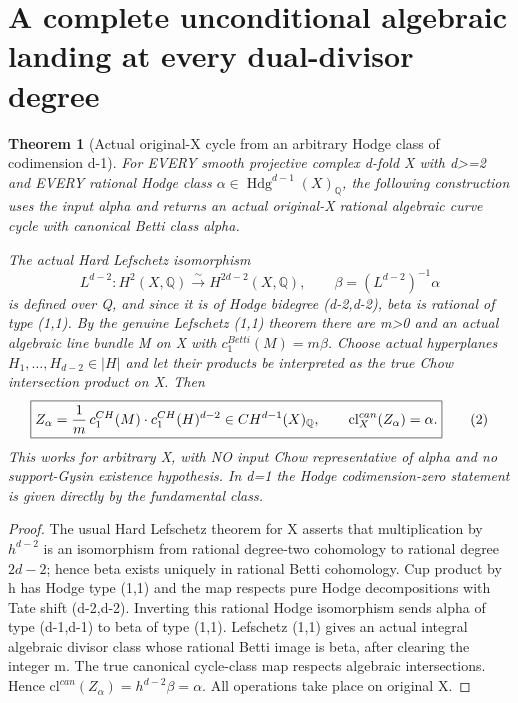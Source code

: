 \documentclass[11pt]{article}
\newtheorem{theorem}{Theorem}[section]
\begin{document}
\section{A complete unconditional algebraic landing at every dual-divisor degree}
\begin{theorem}[Actual original-X cycle from an arbitrary Hodge class of codimension d-1]
For EVERY smooth projective complex d-fold X with d>=2
and EVERY rational Hodge class
$\alpha\in\operatorname{Hdg}^{d-1}(X)_{\mathbb Q}$,
the following construction uses the input alpha
and returns an actual original-X rational algebraic
curve cycle with canonical Betti class alpha.

The actual Hard Lefschetz isomorphism
\[
 L^{d-2}:H^2(X,\mathbb Q)
           \overset{\sim}{\longrightarrow}
           H^{2d-2}(X,\mathbb Q),\qquad
 \beta=(L^{d-2})^{-1}\alpha                       \tag{1}
\]
is defined over Q, and since it is of Hodge bidegree
(d-2,d-2), beta is rational of type (1,1).
By the genuine Lefschetz (1,1) theorem there are
m>0 and an actual algebraic line bundle M on X with
$c_1^{Betti}(M)=m\beta$.
Choose actual hyperplanes $H_1,\dots,H_{d-2}\in|H|$
and let their products be interpreted as the true
Chow intersection product on X. Then
\[
 \boxed{
 Z_\alpha=
 {1\over m}\,
 c_1^{CH}(M)\cdot
 c_1^{CH}(H)^{d-2}
 \in CH^{d-1}(X)_{\mathbb Q},
 \qquad \mathrm{cl}^{can}_X(Z_\alpha)=\alpha.
 }                                                     \tag{2}
\]
This works for arbitrary X, with NO input Chow
representative of alpha and no support-Gysin
existence hypothesis. In d=1 the Hodge
codimension-zero statement is given directly by
the fundamental class.
\end{theorem}
\begin{proof}
The usual Hard Lefschetz theorem for X asserts that
multiplication by $h^{d-2}$ is an isomorphism from
rational degree-two cohomology to rational degree
$2d-2$; hence beta exists uniquely in rational Betti
cohomology. Cup product by h has Hodge type (1,1)
and the map respects pure Hodge decompositions
with Tate shift (d-2,d-2). Inverting this rational
Hodge isomorphism sends alpha of type (d-1,d-1)
to beta of type (1,1). Lefschetz (1,1) gives an
actual integral algebraic divisor class whose
rational Betti image is beta, after clearing the
integer m. The true canonical cycle-class map
respects algebraic intersections. Hence
$\mathrm{cl}^{can}(Z_\alpha)
=h^{d-2}\beta=\alpha$.
All operations take place on original X.
\end{proof}
\end{document}
